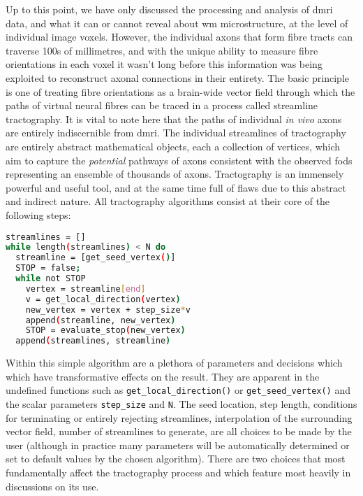 Up to this point, we have only discussed the processing and analysis of \gls{dmri} data, and what it can or cannot reveal about \gls{wm} microstructure, at the level of individual image \glspl{voxel}.
However, the individual axons that form fibre tracts can traverse 100s of millimetres, and with the unique ability to measure fibre orientations in each voxel it wasn't long before this information was being exploited to reconstruct axonal connections in their entirety.
The basic principle is one of treating fibre orientations as a brain-wide vector field through which the paths of virtual neural fibres can be traced in a process called streamline tractography.
It is vital to note here that the paths of individual \textit{in vivo} axons are entirely indiscernible from \gls{dmri}.
The individual streamlines of tractography are entirely abstract mathematical objects, each a collection of vertices, which aim to capture the \textit{potential} pathways of axons consistent with the observed \glspl{fod} representing an ensemble of thousands of axons.
Tractography is an immensely powerful and useful tool, and at the same time full of flaws due to this abstract and indirect nature.
All tractography algorithms consist at their core of the following steps:

\begin{lstlisting}[language=bash, frame=single]
streamlines = []
while length(streamlines) < N do
  streamline = [get_seed_vertex()]
  STOP = false;
  while not STOP
    vertex = streamline[end]
    v = get_local_direction(vertex)
    new_vertex = vertex + step_size*v
    append(streamline, new_vertex)
    STOP = evaluate_stop(new_vertex)
  append(streamlines, streamline)
\end{lstlisting}

Within this simple algorithm are a plethora of parameters and decisions which which have transformative effects on the result.
They are apparent in the undefined functions such as \verb|get_local_direction()| or \verb|get_seed_vertex()| and the scalar parameters \verb|step_size| and \verb|N|.
The seed location, step length, conditions for terminating or entirely rejecting streamlines, interpolation of the surrounding vector field, number of streamlines to generate, are all choices to be made by the user (although in practice many parameters will be automatically determined or set to default values by the chosen algorithm).
There are two choices that most fundamentally affect the tractography process and which feature most heavily in discussions on its use.

